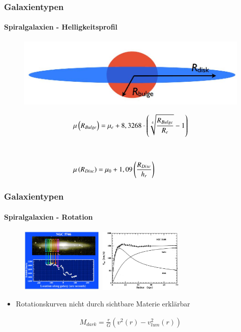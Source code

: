 \begin{frame}
\frametitle{Galaxientypen}
\framesubtitle{Spiralgalaxien - Helligkeitsprofil}

\begin{figure}
\includegraphics[scale=0.25]{Spiralgalaxie_Schema.jpg}
\end{figure}

\begin{align*}
&\mu \left( R_{Bulge} \right) = \mu_e + 8,3268 \cdot \left( \sqrt[4]{\frac{R_{Bulge}}{R_e}} - 1 \right) \\
\hfill \\
\hfill \\
&\mu \left( R_{Disc} \right) = \mu_0 + 1,09 \left( \frac{R_{Disc}}{h_r} \right)
\end{align*}

\end{frame}

\begin{frame}
\frametitle{Galaxientypen}
\framesubtitle{Spiralgalaxien - Rotation}


\begin{figure}
\begin{minipage}[hbt]{4cm}
	\includegraphics[width=4cm]{Spiralgalaxie_Rotation1.jpg}
\end{minipage}
\begin{minipage}[hbt]{4cm}
	\includegraphics[width=4cm]{Spiralgalaxie_Rotation2.jpg}
\end{minipage}
\end{figure}

\begin{itemize}
\item Rotationskurven nicht durch sichtbare Materie erklärbar
\end{itemize}


\begin{align*}
M_{dark} = \frac{r}{G} \left( v^2(r) - v_{lum}^2(r) \right)
\end{align*}

\end{frame}


